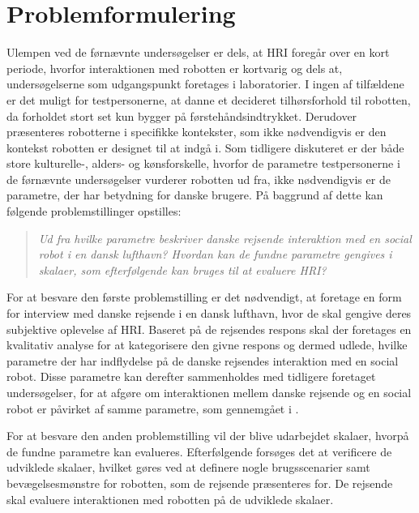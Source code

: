 \section{Problemformulering}
\label{Problemformulering}
%
Ulempen ved de førnævnte undersøgelser er dels, at HRI foregår over en kort periode, hvorfor interaktionen med robotten er kortvarig og dels at, undersøgelserne som udgangspunkt foretages i laboratorier. I ingen af tilfældene er det muligt for testpersonerne, at danne et decideret tilhørsforhold til robotten, da forholdet stort set kun bygger på førstehåndsindtrykket. Derudover præsenteres robotterne i specifikke kontekster, som ikke nødvendigvis er den kontekst robotten er designet til at indgå i. Som tidligere diskuteret er der både store kulturelle-, alders- og kønsforskelle, hvorfor de parametre testpersonerne i de førnævnte undersøgelser vurderer robotten ud fra, ikke nødvendigvis er de parametre, der har betydning for danske brugere. På baggrund af dette kan følgende problemstillinger opstilles:\blankline
%
\begin{quotation}
	\noindent
	\textit{Ud fra hvilke parametre beskriver danske rejsende interaktion med en social robot i en dansk lufthavn?\blankline
		Hvordan kan de fundne parametre gengives i skalaer, som efterfølgende kan bruges til at evaluere HRI?}\blankline
\end{quotation}
%
For at besvare den første problemstilling er det nødvendigt, at foretage en form for interview med danske rejsende i en dansk lufthavn, hvor de skal gengive deres subjektive oplevelse af HRI. Baseret på de rejsendes respons skal der foretages en kvalitativ analyse for at kategorisere den givne respons og dermed udlede, hvilke parametre der har indflydelse på de danske rejsendes interaktion med en social robot. Disse parametre kan derefter sammenholdes med tidligere foretaget undersøgelser, for at afgøre om interaktionen mellem danske rejsende og en social robot er påvirket af samme parametre, som gennemgået i . 

For at besvare den anden problemstilling vil der blive udarbejdet skalaer, hvorpå de fundne parametre kan evalueres. Efterfølgende forsøges det at verificere de udviklede skalaer, hvilket gøres ved at definere nogle brugsscenarier samt bevægelsesmønstre for robotten, som de rejsende præsenteres for. De rejsende skal evaluere interaktionen med robotten på de udviklede skalaer.


